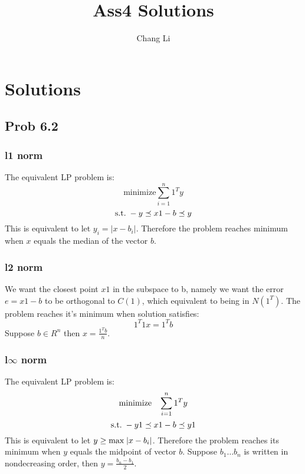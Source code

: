 \message{ !name(ass4_ChangLi.tex)}\documentclass[10pt,a4paper]{article}
\begin{document}

\title{Ass4 Solutions}
\author{Chang Li}
\maketitle

\section{Solutions}

\subsection{Prob 6.2}

\subsubsection{l1 norm}

The equivalent LP problem is:
$$
\text{minimize} \sum_{i=1}^n 1^Ty
$$
$$
\text{s.t.\;}  -y \preceq x1-b \preceq y
$$
This is equivalent to let $y_i = |x - b_i|$. Therefore the problem
reaches minimum when $x$ equals the median of the vector $b$.

\subsubsection{l2 norm}
We want the closest point $x1$ in the subspace to b, namely
we want the error $e = x1 - b$ to be orthogonal to $C(1)$,
which equivalent to being in $N(1^T)$. The problem reaches
it's minimum when solution satisfies:
$$
1^T1x=1^Tb
$$
Suppose $b\in R^n$ then $x=\frac{1^Tb}{n}$.


\subsubsection{l$\infty$ norm}

The equivalent LP problem is:
$$
\text{minimize \;\;}\sum_{i=1}^n 1^Ty
$$
$$
\text{s.t.\;}  -y1 \preceq x1-b \preceq y1
$$
This is equivalent to let $y \geq \text{max\;}|x - b_i|$.
Therefore the problem reaches its minimum when $y$ equals
the midpoint of vector $b$. Suppose $b_1 \dots b_n$ is
written in nondecreasing order, then $y=\frac{b_n-b_1}{2}$.
\end{document}
